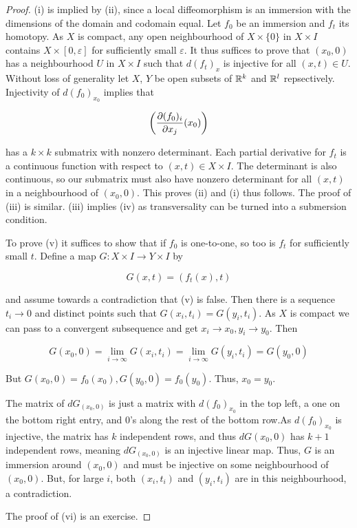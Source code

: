 \begin{proof}
    (i) is implied by (ii), since a local diffeomorphism is an immersion with the dimensions of the domain and codomain equal. Let $f_0$ be an immersion and $f_t$ its homotopy. As $X$ is compact, any open neighbourhood of $X \times \{0\}$ in $X \times I$ contains $X \times [0,\varepsilon]$ for sufficiently small $\varepsilon$. It thus suffices to prove that $(x_0,0)$ has a neighbourhood $U$ in $X \times I$ such that $d(f_t)_x$ is injective for all $(x,t) \in U$. Without loss of generality let $X$, $Y$ be open subsets of $\mathbb{R}^k$ and $\mathbb{R}^l$ repsectively. Injectivity of $d(f_0)_{x_0}$ implies that 

    \[\left(\dfrac{\partial (f_0)_i}{\partial x_j}(x_0)\right)\]

    has a $k \times k$ submatrix with nonzero determinant. Each partial derivative for $f_t$ is a continuous function with respect to $(x,t) \in X \times I$. The determinant is also continuous, so our submatrix must also have nonzero determinant for all $(x,t)$ in a neighbourhood of $(x_0,0)$. This proves (ii) and (i) thus follows. The proof of (iii) is similar. (iii) implies (iv) as transversality can be turned into a submersion condition. 

    To prove (v) it suffices to show that if $f_0$ is one-to-one, so too is $f_t$ for sufficiently small $t$. Define a map $G: X \times I \to Y \times I$ by 

    \[G(x,t) = (f_t(x),t)\]

    and assume towards a contradiction that (v) is false. Then there is a sequence $t_i \to 0$ and distinct points such that $G(x_i,t_i) = G(y_i,t_i)$. As $X$ is compact we can pass to a convergent subsequence and get $x_i \to x_0, y_i \to y_0$. Then 

    \[G(x_0,0) = \lim_{i\to \infty}G(x_i,t_i) = \lim_{i \to \infty}G(y_i,t_i) = G(y_0,0)\]

    But $G(x_0,0) = f_0(x_0), G(y_0,0) = f_0(y_0)$. Thus, $x_0 = y_0$.

    The matrix of $dG_{(x_0,0)}$ is just a matrix with $d(f_0)_{x_0}$ in the top left, a one on the bottom right entry, and 0's along the rest of the bottom row.As $d(f_0)_{x_0}$ is injective, the matrix has $k$ independent rows, and thus $dG(x_0,0)$ has $k+1$ independent rows, meaning $dG_{(x_0,0)}$ is an injective linear map. Thus, $G$ is an immersion around $(x_0,0)$ and must be injective on some neighbourhood of $(x_0,0)$. But, for large $i$, both $(x_i,t_i)$ and $(y_i,t_i)$ are in this neighbourhood, a contradiction. 

    The proof of (vi) is an exercise. 
\end{proof}